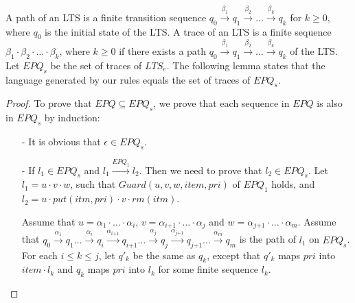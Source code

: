 A path of an LTS is a finite transition sequence $q_0\xrightarrow{\beta_1}q_1\overset{\beta_2}{\longrightarrow}\ldots\overset{\beta_k}{\longrightarrow}q_k$ for $k\geq 0$, where $q_0$ is the initial state of the LTS. A trace of an LTS is a finite sequence $\beta_1 \cdot \beta_2 \cdot \ldots \cdot \beta_k$, where $k \geq 0$ if there exists a path $q_0\overset{\beta_1}{\longrightarrow}q_1\overset{\beta_2}{\longrightarrow}\ldots\overset{\beta_k}{\longrightarrow}q_k$ of the LTS. Let $\textit{EPQ}_s$ be the set of traces of $\textit{LTS}_e$. The following lemma states that the language generated by our rules equals the set of traces of $\textit{EPQ}_s$.


\EPQRulesAndSemantics*

\begin {proof}

To prove that $\textit{EPQ} \subseteq \textit{EPQ}_s$, we prove that each sequence in $\textit{EPQ}$ is also in $\textit{EPQ}_s$ by induction:

\begin{itemize}
\setlength{\itemsep}{0.5pt}
\item[-] It is obvious that $\epsilon \in \textit{EPQ}_s$.

\item[-] If $l_1 \in \textit{EPQ}_s$ and $l_1 \xrightarrow{\textit{EPQ}_1} l_2$. Then we need to prove that $l_2 \in \textit{EPQ}_s$. Let $l_1 = u \cdot v \cdot w$, such that $\textit{Guard}(u,v,w,\textit{item},\textit{pri})$ of $\textit{EPQ}_1$ holds, and $l_2 = u \cdot \textit{put}(\textit{itm},\textit{pri}) \cdot v \cdot \textit{rm}(\textit{itm})$.

    Assume that $u = \alpha_1 \cdot \ldots \cdot \alpha_i$, $v = \alpha_{\textit{i+1}} \cdot \ldots \cdot \alpha_j$ and $w = \alpha_{\textit{j+1}} \cdot \ldots \cdot \alpha_m$. Assume that $q_0 \xrightarrow{\alpha_1} q_1 \ldots \xrightarrow{\alpha_i} q_i \xrightarrow{\alpha_{\textit{i+1}}} q_{\textit{i+1}} \ldots  \xrightarrow{\alpha_j} q_j \xrightarrow{\alpha_{\textit{j+1}}} q_{\textit{j+1}} \ldots \xrightarrow{\alpha_m} q_m$ is the path of $l_1$ on $\textit{EPQ}_s$. For each $i \leq k \leq j$, let $q'_k$ be the same as $q_k$, except that $q'_k$ maps $\textit{pri}$ into $\textit{item} \cdot l_k$ and $q_k$ maps $\textit{pri}$ into $l_k$ for some finite sequence $l_k$.


\end{itemize}
\end{proof}
